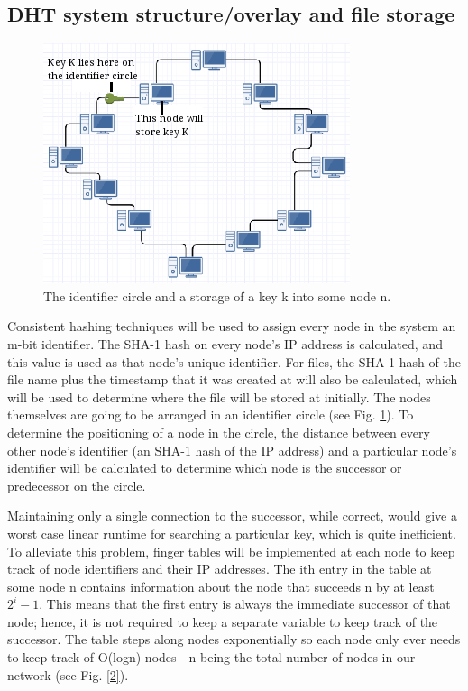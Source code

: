 \documentclass[fleqn,24pt]{SelfArx} %
\begin{document}
\subsection{DHT system structure/overlay and file storage}

\begin{figure}
\includegraphics{Selection_152.png}
\caption{\label{family}The identifier circle and a storage of a key k into some node n.}
\label{1}
\end{figure}

Consistent hashing techniques will be used to assign every node in the system an m-bit identifier. The SHA-1 hash on every node’s IP address is calculated, and this value is used as that node's unique identifier. For files, the SHA-1 hash of the file name plus the timestamp that it was created at will also be calculated, which will be used to determine where the file will be stored at initially. The nodes themselves are going to be arranged in an identifier circle (see Fig. \ref{1}). To determine the positioning of a node in the circle, the distance between every other node's identifier (an SHA-1 hash of the IP address) and a particular node's identifier will be calculated to determine which node is the successor or predecessor on the circle.   

Maintaining only a single connection to the successor, while correct, would give a worst case linear runtime for searching a particular key, which is quite inefficient. To alleviate this problem, finger tables \cite{1} will be implemented at each node to keep track of node identifiers and their IP addresses. The ith entry in the table at some node n contains information about the node that succeeds n by at least $2^i - 1$. This means that the first entry is always the immediate successor of that node; hence, it is not required to keep a separate variable to keep track of the successor. The table steps along nodes exponentially so each node only ever needs to keep track of O(logn) nodes - n being the total number of nodes in our network (see Fig. \ref{2}).
\end{document}
